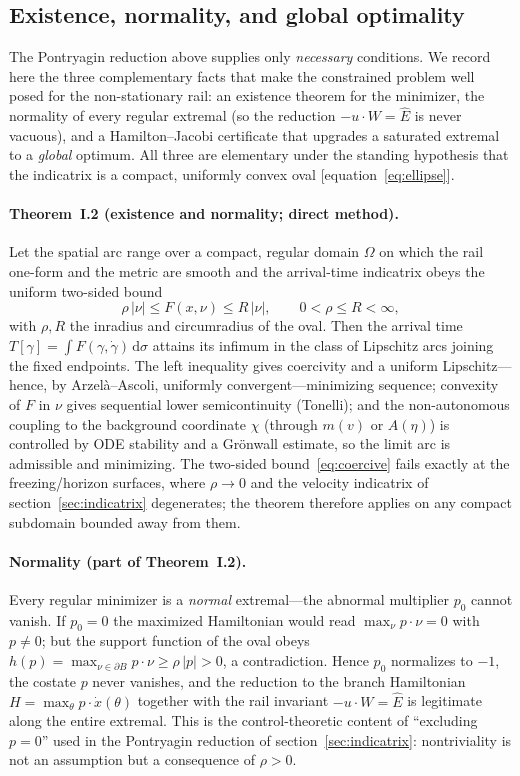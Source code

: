 \documentclass[12pt]{iopart}
\newcommand{\Ehat}{\hat E}
\newcommand{\dd}{\mathrm{d}}
\begin{document}
\subsection{Existence, normality, and global optimality}
\label{sec:control-foundations}
The Pontryagin reduction above supplies only \emph{necessary} conditions. We
record here the three complementary facts that make the constrained problem well
posed for the non-stationary rail: an existence theorem for the minimizer, the
normality of every regular extremal (so the reduction $-u\cdot W=\Ehat$ is never
vacuous), and a Hamilton--Jacobi certificate that upgrades a saturated extremal to
a \emph{global} optimum. All three are elementary under the standing hypothesis
that the indicatrix is a compact, uniformly convex oval [equation~\eqref{eq:ellipse}].

\paragraph{Theorem~I.2 (existence and normality; direct method).} Let the spatial arc range over a compact,
regular domain $\Omega$ on which the rail one-form and the metric are smooth and
the arrival-time indicatrix obeys the uniform two-sided bound
\begin{equation}
  \rho\,|\nu| \le F(x,\nu) \le R\,|\nu|, \qquad 0<\rho\le R<\infty,
  \label{eq:coercive}
\end{equation}
with $\rho,R$ the inradius and circumradius of the oval. Then the arrival time
$T[\gamma]=\int F(\gamma,\dot\gamma)\,\dd\sigma$ attains its infimum in the class
of Lipschitz arcs joining the fixed endpoints. The left inequality gives
coercivity and a uniform Lipschitz---hence, by Arzel\`a--Ascoli, uniformly
convergent---minimizing sequence; convexity of $F$ in $\nu$ gives sequential lower
semicontinuity (Tonelli); and the non-autonomous coupling to the background
coordinate $\chi$ (through $m(v)$ or $A(\eta)$) is controlled by ODE stability and a
Gr\"onwall estimate, so the limit arc is admissible and minimizing. The two-sided
bound~\eqref{eq:coercive} fails exactly at the freezing/horizon surfaces, where
$\rho\to0$ and the velocity indicatrix of section~\ref{sec:indicatrix} degenerates; the
theorem therefore applies on any compact subdomain bounded away from them.

\paragraph{Normality (part of Theorem~I.2).} Every regular minimizer is a \emph{normal} extremal---the
abnormal multiplier $p_0$ cannot vanish. If $p_0=0$ the maximized Hamiltonian
would read $\max_\nu p\cdot\nu=0$ with $p\neq0$; but the support function of the oval
obeys $h(p)=\max_{\nu\in\partial B}p\cdot\nu\ge\rho\,|p|>0$, a contradiction. Hence
$p_0$ normalizes to $-1$, the costate $p$ never vanishes, and the reduction to the
branch Hamiltonian $H=\max_\theta p\cdot\dot x(\theta)$ together with the rail
invariant $-u\cdot W=\Ehat$ is legitimate along the entire extremal. This is the
control-theoretic content of ``excluding $p=0$'' used in the Pontryagin reduction
of section~\ref{sec:indicatrix}: nontriviality is not an assumption but a consequence
of $\rho>0$.
\end{document}
